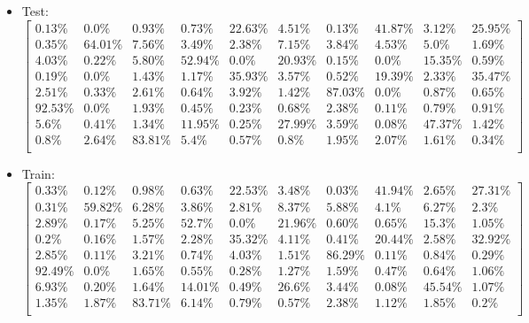 \documentclass[a4paper,14pt]{report}
\begin{document}
	\begin{itemize}
		\item Test:
		$
		\begin{bmatrix}
		0.13\% & 0.0\% & 0.93\% & 0.73\% & 22.63\% & 4.51\% & 0.13\% & 41.87\% & 3.12\% & 25.95\% \\
		0.35\% & 64.01\% & 7.56\% & 3.49\% & 2.38\% & 7.15\% & 3.84\% & 4.53\% & 5.0\% & 1.69\% \\
		4.03\% & 0.22\% & 5.80\% & 52.94\% & 0.0\% & 20.93\% & 0.15\% & 0.0\% & 15.35\% & 0.59\% \\
		0.19\% & 0.0\% & 1.43\% & 1.17\% & 35.93\% & 3.57\% & 0.52\% & 19.39\% & 2.33\% & 35.47\% \\
		2.51\% & 0.33\% & 2.61\% & 0.64\% & 3.92\% & 1.42\% & 87.03\% & 0.0\% & 0.87\% & 0.65\% \\
		92.53\% & 0.0\% & 1.93\% & 0.45\% & 0.23\% & 0.68\% & 2.38\% & 0.11\% & 0.79\% & 0.91\% \\
		5.6\% & 0.41\% & 1.34\% & 11.95\% & 0.25\% & 27.99\% & 3.59\% & 0.08\% & 47.37\% & 1.42\% \\
		0.8\% & 2.64\% & 83.81\% & 5.4\% & 0.57\% & 0.8\% & 1.95\% & 2.07\% & 1.61\% & 0.34\% \\
		\end{bmatrix} 
		$
		\item Train:
		$
		\begin{bmatrix}
		0.33\% & 0.12\% & 0.98\% & 0.63\% & 22.53\% & 3.48\% & 0.03\% & 41.94\% & 2.65\% & 27.31\% \\
		0.31\% & 59.82\% & 6.28\% & 3.86\% & 2.81\% & 8.37\% & 5.88\% & 4.1\% & 6.27\% & 2.3\% \\
		2.89\% & 0.17\% & 5.25\% & 52.7\% & 0.0\% & 21.96\% & 0.60\% & 0.65\% & 15.3\% & 1.05\% \\
		0.2\% & 0.16\% & 1.57\% & 2.28\% & 35.32\% & 4.11\% & 0.41\% & 20.44\% & 2.58\% & 32.92\% \\
		2.85\% & 0.11\% & 3.21\% & 0.74\% & 4.03\% & 1.51\% & 86.29\% & 0.11\% & 0.84\% & 0.29\% \\
		92.49\% & 0.0\% & 1.65\% & 0.55\% & 0.28\% & 1.27\% & 1.59\% & 0.47\% & 0.64\% & 1.06\% \\
		6.93\% & 0.20\% & 1.64\% & 14.01\% & 0.49\% & 26.6\% & 3.44\% & 0.08\% & 45.54\% & 1.07\% \\
		1.35\% & 1.87\% & 83.71\% & 6.14\% & 0.79\% & 0.57\% & 2.38\% & 1.12\% & 1.85\% & 0.2\% \\
		\end{bmatrix} 
		$
	\end{itemize}
\end{document}
